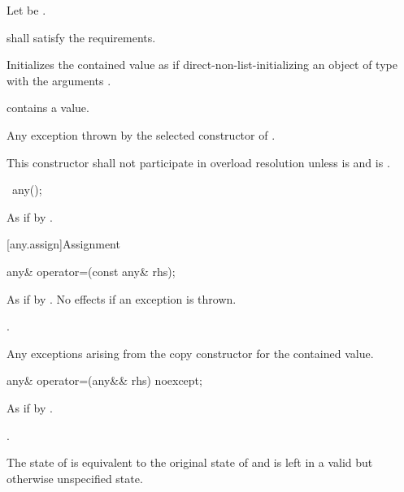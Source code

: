 \begin{itemdescr}
\pnum
Let  be .

\pnum
\requires {} shall satisfy the  requirements.

\pnum
\effects Initializes the contained value as if direct-non-list-initializing an object of
type  with the arguments .

\pnum
\ensures {} contains a value.

\pnum
\throws Any exception thrown by the selected constructor of .

\pnum
\remarks
This constructor shall not participate in overload resolution unless
 is  and
 is .
\end{itemdescr}

\begin{itemdecl}
~any();
\end{itemdecl}

\begin{itemdescr}
\pnum
\effects
As if by .
\end{itemdescr}

[any.assign]{Assignment}

%
\begin{itemdecl}
any& operator=(const any& rhs);
\end{itemdecl}

\begin{itemdescr}
\pnum
\effects
As if by .
No effects if an exception is thrown.

\pnum
\returns
{}.

\pnum
\throws
Any exceptions arising from the copy constructor for the contained value.
\end{itemdescr}

%
\begin{itemdecl}
any& operator=(any&& rhs) noexcept;
\end{itemdecl}

\begin{itemdescr}
\pnum
\effects
As if by .

\pnum
\returns
{}.

\pnum
\ensures
The state of  is equivalent to the original state of 
and  is left in a valid but otherwise unspecified state.
\end{itemdescr}

